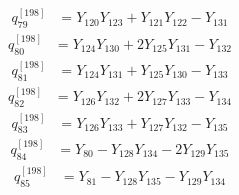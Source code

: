 \begin{equation}\label{q198:row:079}
\begin{aligned}
q_{79}^{[198]} &={} Y_{120}Y_{123} + Y_{121}Y_{122} - Y_{131}
\end{aligned}
\end{equation}
\begin{equation}\label{q198:row:080}
\begin{aligned}
q_{80}^{[198]} &={} Y_{124}Y_{130} + 2Y_{125}Y_{131} - Y_{132}
\end{aligned}
\end{equation}
\begin{equation}\label{q198:row:081}
\begin{aligned}
q_{81}^{[198]} &={} Y_{124}Y_{131} + Y_{125}Y_{130} - Y_{133}
\end{aligned}
\end{equation}
\begin{equation}\label{q198:row:082}
\begin{aligned}
q_{82}^{[198]} &={} Y_{126}Y_{132} + 2Y_{127}Y_{133} - Y_{134}
\end{aligned}
\end{equation}
\begin{equation}\label{q198:row:083}
\begin{aligned}
q_{83}^{[198]} &={} Y_{126}Y_{133} + Y_{127}Y_{132} - Y_{135}
\end{aligned}
\end{equation}
\begin{equation}\label{q198:row:084}
\begin{aligned}
q_{84}^{[198]} &={} Y_{80} - Y_{128}Y_{134} - 2Y_{129}Y_{135}
\end{aligned}
\end{equation}
\begin{equation}\label{q198:row:085}
\begin{aligned}
q_{85}^{[198]} &={} Y_{81} - Y_{128}Y_{135} - Y_{129}Y_{134}
\end{aligned}
\end{equation}
